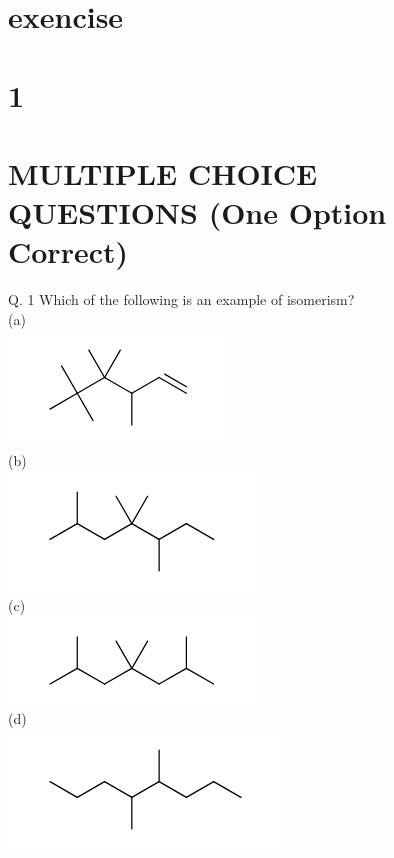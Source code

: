 \documentclass[10pt]{article}
\begin{document}
\section*{exencise}
\section*{1}
\section*{MULTIPLE CHOICE QUESTIONS (One Option Correct)}
Q. 1 Which of the following is an example of isomerism?\\
(a)\\
\includegraphics{smile-57e19c7ce0e9352b6116d644c4ad0f30448984ce}\\
(b)\\
\includegraphics{smile-d0d48d1894e1a784c603cde404e4277155b1ab7d}\\
(c)\\
\includegraphics{smile-65ef674cf2177ddbd1b4a46668f67751144b8522}\\
(d)\\
\includegraphics{smile-d2bb09eb39618847080eca1af57b1721ba6e51e4}\\
\end{document}
